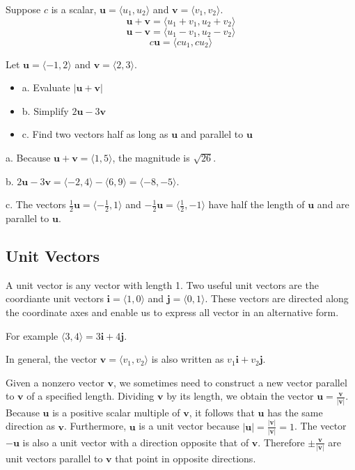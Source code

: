 \documentclass[../calc3.tex]{subfiles}
\begin{document}
\begin{definition}
    Suppose $c$ is a scalar, $\textbf{u}=\langle u_1,u_2\rangle$ and $\textbf{v}=\langle v_1,v_2\rangle$.
    \[ \textbf{u}+\textbf{v}=\langle u_1+v_1,u_2+v_2\rangle \] 
    \[ \textbf{u}-\textbf{v}=\langle u_1-v_1,u_2-v_2\rangle \]
    \[ c\textbf{u}=\langle cu_1, cu_2\rangle \]
\end{definition}
\pagebreak
\begin{example}
    Let $\textbf{u}=\langle -1,2\rangle$ and $\textbf{v}=\langle 2,3\rangle$.
    \begin{itemize}
        \item a. Evaluate $|\textbf{u}+\textbf{v}|$
        \item b. Simplify $2\textbf{u}-3\textbf{v}$
        \item c. Find two vectors half as long as $\textbf{u}$ and parallel to $\textbf{u}$
    \end{itemize}

    a. Because $\textbf{u}+\textbf{v}=\langle 1,5\rangle$, the magnitude is $\sqrt{26}$.
    
    b. $2\textbf{u}-3\textbf{v}=\langle -2,4\rangle - \langle 6,9\rangle = \langle -8,-5\rangle$.

    c. The vectors $\frac{1}{2}\textbf{u}=\langle -\frac{1}{2}, 1\rangle$ and $-\frac{1}{2}\textbf{u}=\langle \frac{1}{2},-1\rangle$ have half the length of $\textbf{u}$ and are parallel to $\textbf{u}$.
\end{example}

\subsection*{Unit Vectors}
A unit vector is any vector with length 1. Two useful unit vectors are the coordiante unit vectors $\textbf{i}=\langle 1,0\rangle$ and $\textbf{j}=\langle 0,1\rangle$.
These vectors are directed along the coordinate axes and enable us to express all vector in an alternative form.

For example $\langle 3,4\rangle = 3\textbf{i}+4\textbf{j}$.

In general, the vector $\textbf{v}=\langle v_1,v_2\rangle$ is also written as $v_1\textbf{i}+v_2\textbf{j}$.

Given a nonzero vector $\textbf{v}$, we sometimes need to construct a new vector parallel to $\textbf{v}$ of a specified length. Dividing $\textbf{v}$ by its length, we obtain the vector $\textbf{u}=\frac{\textbf{v}}{|\textbf{v}|}$. Because $\textbf{u}$ is a 
positive scalar multiple of $\textbf{v}$, it follows that $\textbf{u}$ has the same direction as $\textbf{v}$. Furthermore, $\textbf{u}$ is a unit vector because $|\textbf{u}|=\frac{|\textbf{v}|}{|\textbf{v}|}=1$. The vector $-\textbf{u}$ is also a unit vector with a direction opposite that of $\textbf{v}$.
Therefore $\pm \frac{\textbf{v}}{|\textbf{v}|}$ are unit vectors parallel to $\textbf{v}$ that point in opposite directions.
\end{document}
